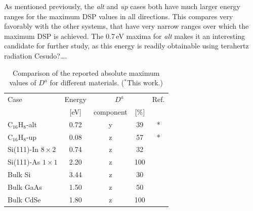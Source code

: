 \documentclass[pss]{wiley2sp} %
\begin{document}
As mentioned previously, the \emph{alt} and \emph{up} cases both have much larger energy ranges for the maximum DSP values in all directions. This compares very favorably with the other systems, that have very narrow ranges over which the maximum DSP is achieved. The 0.7\,eV maxima for \emph{alt} makes it an interesting candidate for further study, as this energy is readily obtainable using terahertz radiation \large{Cesudo?\ldots}.

\begin{table}[b]
  \sidecaption
  \begin{tabular}{lcccc}
  \hline
  Case & Energy &  \multicolumn{2}{c}{$D^{a}$} &  Ref.\\
  \cline{3-4}
  & [eV]   & component & [\%] \\
  \hline
  C$_{16}$H$_{8}$-alt  & 0.72 & y & 39  & * \\
  C$_{16}$H$_{8}$-up   & 0.08 & z & 57  & * \\
  Si(111)-In $8\times2$& 0.74 & z & 32  & \cite{arzatePRB14}  \\
  Si(111)-As $1\times1$& 2.20 & z & 100 & \cite{mendozaPRB12} \\
  Bulk Si              & 3.44 & z & 30  & \cite{nastosPRB07}     \\
  Bulk GaAs            & 1.50 & z & 50  & \cite{nastosPRB07,bhatPRB05} \\
  Bulk CdSe            & 1.80 & z & 100 & \cite{nastosPRB07}\\
  \hline
  \end{tabular}
  \caption[]{%
  Comparison of the reported absolute maximum values of {$D^{a}$} for different materials. ($^{*}$This work.)}
  \label{tab:dacomp}
\end{table}
\end{document}
